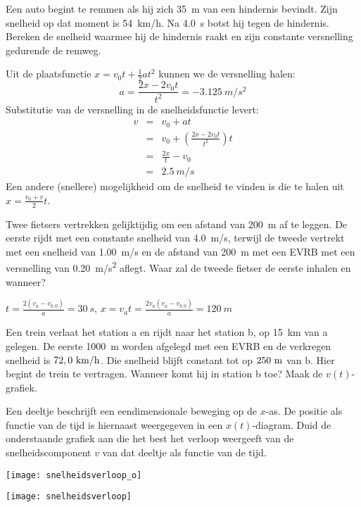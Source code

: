 \documentclass{ximera}
\begin{document}
\begin{exercise}
    Een auto begint te remmen als hij zich \SI{35}{m} van een hindernis bevindt. Zijn snelheid op dat moment is \SI{54}{km/h}. Na \SI{4,0}{s} botst hij tegen de hindernis. Bereken de snelheid waarmee hij de hindernis raakt en zijn constante versnelling gedurende de remweg.
    \begin{oplossing}
    Uit de plaatsfunctie $x=v_0t+\frac{1}{2}at^2$ kunnen we de versnelling halen:
    \begin{equation*}
        a=\frac{2x-2v_0t}{t^2}=\SI{-3,125}{m/s^2}
    \end{equation*}
    Substitutie van de versnelling in de snelheidsfunctie levert:
    \begin{eqnarray*}
        v&=&v_0+at\\
        &=&v_0+\left(\frac{2x-2v_0t}{t^2}\right)t\\
        &=&\frac{2x}{t}-v_0\\
        &=&\SI{2,5}{m/s}
    \end{eqnarray*}
    Een andere (snellere) mogelijkheid om de snelheid te vinden is die te halen uit $x=\frac{v_0+v}{2}t$.
    \end{oplossing}
\end{exercise}

\begin{exercise}
    Twee fietsers vertrekken gelijktijdig om een afstand van \SI{200}{m} af te leggen. De eerste rijdt met een constante snelheid van \SI{4,0}{m/s}, terwijl de tweede vertrekt met een snelheid van \SI{1,00}{m/s} en de afstand van \SI{200}{m} met een EVRB met een versnelling van \SI{0,20}{m/s^2} aflegt. Waar zal de tweede fietser de eerste inhalen en wanneer?
    \begin{oplossing}
        $t=\frac{2(v_a-v_{b,0})}{a}=\SI{30}{s}$,
        $x=v_at=\frac{2v_a(v_a-v_{b,0})}{a}=\SI{120}{m}$
    \end{oplossing}
\end{exercise}

\begin{exercise}
        Een trein verlaat het station a en rijdt naar het station b, op \SI{15}{km} van a gelegen. De eerste \SI{1000}{m} worden afgelegd met een EVRB en de verkregen snelheid is $72,0~\rm km/h$. Die snelheid blijft constant tot op $250~\rm m$ van b. Hier begint de trein te vertragen. Wanneer komt hij in station b toe? Maak de $v(t)$-grafiek.
\end{exercise}

\begin{exercise}
    Een deeltje beschrijft een eendimensionale beweging op de $x$-as. De positie als functie van de tijd is hiernaast weergegeven in een $x(t)$-diagram. Duid de onderstaande grafiek aan die het best het verloop weergeeft van de snelheidscomponent $v$ van dat deeltje als functie van de tijd. 
    \begin{image}
        \texttt{[image: snelheidsverloop\_o]}
    \end{image}
    \begin{image}
        \texttt{[image: snelheidsverloop]}
    \end{image}
\end{exercise}
\end{document}
